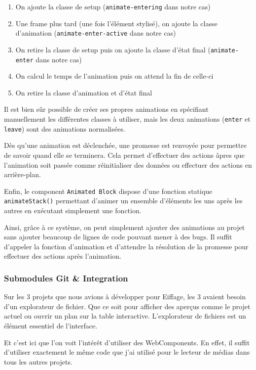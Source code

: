 \begin{enumerate}
    \item On ajoute la classe de setup (\texttt{animate-entering} dans notre cas)
    \item Une frame plus tard (une fois l'élément stylisé), on ajoute la classe d'animation (\texttt{animate-enter-active} dans notre cas)
    \item On retire la classe de setup puis on ajoute la classe d'état final (\texttt{animate-enter} dans notre cas)
    \item On calcul le temps de l'animation puis on attend la fin de celle-ci
    \item On retire la classe d'animation et d'état final
\end{enumerate}

Il est bien sûr possible de créer ses propres animations en spécifiant manuellement les différentes classes à utiliser, mais les deux animations (\texttt{enter} et \texttt{leave}) sont des animations normalisées.

Dès qu'une animation est déclenchée, une promesse est renvoyée pour permettre de savoir quand elle se terminera.
Cela permet d'effectuer des actions âpres que l'animation soit passée comme réinitialiser des données ou effectuer des actions en arrière-plan.

Enfin, le component \texttt{Animated Block} dispose d'une fonction statique \texttt{animateStack()} permettant d'animer un ensemble d'éléments les uns après les autres en exécutant simplement une fonction.

Ainsi, grâce à ce système, on peut simplement ajouter des animations au projet sans ajouter beaucoup de lignes de code pouvant mener à des bugs.
Il suffit d'appeler la fonction d'animation et d'attendre la résolution de la promesse pour effectuer des actions après l'animation.

\subsubsection{Submodules Git \& Integration}

Sur les 3 projets que nous avions à développer pour Eiffage, les 3 avaient besoin d'un explorateur de fichier.
Que ce soit pour afficher des aperçus comme le projet actuel ou ouvrir un plan sur la table interactive.
L'explorateur de fichiers est un élément essentiel de l'interface.

Et c'est ici que l'on voit l'intérêt d'utiliser des WebComponents.
En effet, il suffit d'utiliser exactement le même code que j'ai utilisé pour le lecteur de médias dans tous les autres projets.

